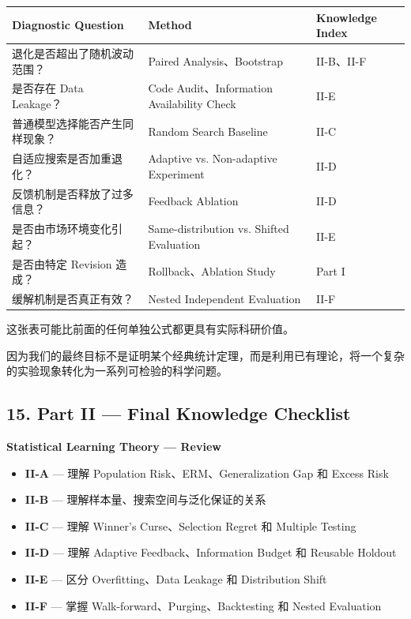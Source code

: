\begin{readertable}
\begin{longtable}[]{@{}
  >{\raggedright\arraybackslash}p{}
  >{\raggedright\arraybackslash}p{}
  >{\raggedright\arraybackslash}p{}@{}}
\toprule
Diagnostic Question & Method & Knowledge Index \\
\midrule
\endhead
退化是否超出了随机波动范围？ & Paired Analysis、Bootstrap & II-B、II-F \\
是否存在 Data Leakage？ & Code Audit、Information Availability Check & II-E \\
普通模型选择能否产生同样现象？ & Random Search Baseline & II-C \\
自适应搜索是否加重退化？ & Adaptive vs. Non-adaptive Experiment & II-D \\
反馈机制是否释放了过多信息？ & Feedback Ablation & II-D \\
是否由市场环境变化引起？ & Same-distribution vs. Shifted Evaluation & II-E \\
是否由特定 Revision 造成？ & Rollback、Ablation Study & Part I \\
缓解机制是否真正有效？ & Nested Independent Evaluation & II-F \\
\bottomrule
\end{longtable}
\end{readertable}

这张表可能比前面的任何单独公式都更具有实际科研价值。

因为我们的最终目标不是证明某个经典统计定理，而是利用已有理论，将一个复杂的实验现象转化为一系列可检验的科学问题。

\hypertarget{part-2-27-0001-part-ii-final-knowledge-checklist}{%
\subsection{15. Part II --- Final Knowledge Checklist}\label{part-2-27-0001-part-ii-final-knowledge-checklist}}

\textbf{Statistical Learning Theory --- Review}

\begin{itemize}
\item
  \textbf{II-A} --- 理解 Population Risk、ERM、Generalization Gap 和 Excess Risk
\item
  \textbf{II-B} --- 理解样本量、搜索空间与泛化保证的关系
\item
  \textbf{II-C} --- 理解 Winner's Curse、Selection Regret 和 Multiple Testing
\item
  \textbf{II-D} --- 理解 Adaptive Feedback、Information Budget 和 Reusable Holdout
\item
  \textbf{II-E} --- 区分 Overfitting、Data Leakage 和 Distribution Shift
\item
  \textbf{II-F} --- 掌握 Walk-forward、Purging、Backtesting 和 Nested Evaluation
\end{itemize}

